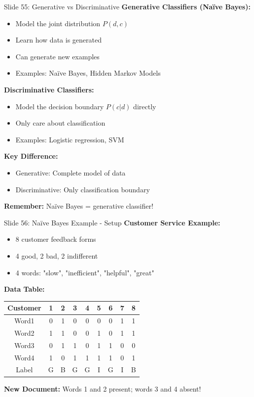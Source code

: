 \documentclass[8pt]{beamer}
\begin{document}
	\begin{frame}{Slide 55: Generative vs Discriminative}
		\fontsize{6.5}{7.5}\selectfont
		\textbf{Generative Classifiers (Naïve Bayes):}
		\begin{itemize}
			\item Model the joint distribution $P(d,c)$
			\item Learn how data is generated
			\item Can generate new examples
			\item Examples: Naïve Bayes, Hidden Markov Models
		\end{itemize}
		
		\vspace{0.1cm}
		\textbf{Discriminative Classifiers:}
		\begin{itemize}
			\item Model the decision boundary $P(c|d)$ directly
			\item Only care about classification
			\item Examples: Logistic regression, SVM
		\end{itemize}
		
		\vspace{0.1cm}
		\textbf{Key Difference:}
		\begin{itemize}
			\item Generative: Complete model of data
			\item Discriminative: Only classification boundary
		\end{itemize}
		
		\textcolor{myblue}{\textbf{Remember:}} Naïve Bayes = generative classifier!
	\end{frame}
	
	\begin{frame}{Slide 56: Naïve Bayes Example - Setup}
		\fontsize{6.5}{7.5}\selectfont
		\textbf{Customer Service Example:}
		\begin{itemize}
			\item 8 customer feedback forms
			\item 4 good, 2 bad, 2 indifferent
			\item 4 words: "slow", "inefficient", "helpful", "great"
		\end{itemize}
		
		\vspace{0.1cm}
		\textbf{Data Table:}
		\begin{tabular}{|c|c|c|c|c|c|c|c|c|}
			\hline
			Customer & 1 & 2 & 3 & 4 & 5 & 6 & 7 & 8 \\
			\hline
			Word1 & 0 & 1 & 0 & 0 & 0 & 0 & 1 & 1 \\
			Word2 & 1 & 1 & 0 & 0 & 1 & 0 & 1 & 1 \\
			Word3 & 0 & 1 & 1 & 0 & 1 & 1 & 0 & 0 \\
			Word4 & 1 & 0 & 1 & 1 & 1 & 1 & 0 & 1 \\
			Label & G & B & G & G & I & G & I & B \\
			\hline
		\end{tabular}
		
		\textcolor{myblue}{\textbf{New Document:}} Words 1 and 2 present; words 3 and 4 absent!
	\end{frame}
	
\end{document}
